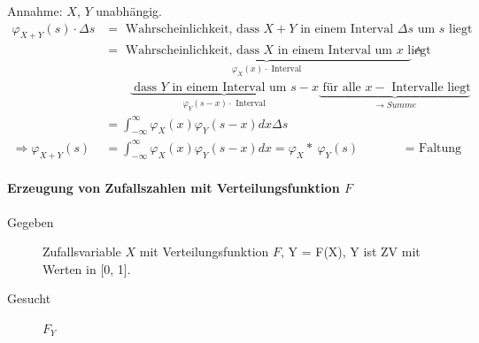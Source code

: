 \documentclass[10pt,a4paper]{scrartcl}
\newif\ifincludeExamples
\begin{document}
Annahme: $X$, $Y$ unabhängig.
\begin{align*}
\varphi_{X+Y}(s) \cdot \Delta s & = \text{ Wahrscheinlichkeit, dass } X+Y \text{ in einem Interval } \Delta s \text{ um } s \text{ liegt} \\
 & = \underbrace{\text{ Wahrscheinlichkeit, dass } X \text{ in einem Interval um } x \text{ liegt }}_{\varphi_X(x) \cdot \text{ Interval}} \wedge \\& \qquad\underbrace{\text{ dass } Y \text{ in einem Interval um } s-x}_{\varphi_Y(s-x)\cdot \text{ Interval}} \underbrace{\text{ für alle } x-\text{ Intervalle liegt}}_{\rightarrow Summe} \\
  &= \int_{-\infty}^\infty \varphi_X(x) \varphi_Y(s-x) dx \Delta s \\
  \Rightarrow \varphi_{X+Y}(s) & = \int_{-\infty}^\infty \varphi_X(x) \varphi_Y(s-x) dx = \varphi_X *\ \varphi_Y(s) & = \text{ Faltung}
\end{align*}

\ifincludeExamples
Beispiel mit $X$, $Y$ gleichverteilt in [0,1]:
\begin{align*}
\varphi_X(x) & = \begin{cases} 0 & x \le 0 \\ 1 & 0 < x \le 1 \\ 0 & x > 1\end{cases}\\
\varphi_{Y}(s-x) & = \begin{cases}0 & s-x> 1 \Leftrightarrow x < s-1 \\ 1 & s-1\le x < s \\ 0 & x\ge s\end{cases} \\
\varphi_{X+Y} (s) & = \int_{-\infty}^\infty \varphi_X(x)\varphi_Y(s-x) dx & \varphi_X(x) \text{ ist immer 1 im relevanten Bereich}\\
                  & = \int_0^1 \varphi_Y(s-x) dx \\
\varphi_{X+Y}(s) & = \begin{cases} 0 & s < 0 \\ s & 0\le s <1 \\1-(s-1) = 2-s & 1 \le s \le 2\\ 0 & s > 2 \end{cases} \\
\end{align*}
\fi

\paragraph{Erzeugung von Zufallszahlen mit Verteilungsfunktion $F$}
\begin{description}
\item[Gegeben] Zufallsvariable $X$ mit Verteilungsfunktion $F$, Y = F(X), Y ist ZV mit Werten in [0, 1].
\item[Gesucht] $F_Y$
\end{description}
\end{document}
